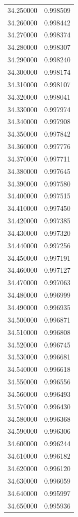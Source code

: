 \begin{tabular}{rr}
34.250000 & 0.998509 \\
34.260000 & 0.998442 \\
34.270000 & 0.998374 \\
34.280000 & 0.998307 \\
34.290000 & 0.998240 \\
34.300000 & 0.998174 \\
34.310000 & 0.998107 \\
34.320000 & 0.998041 \\
34.330000 & 0.997974 \\
34.340000 & 0.997908 \\
34.350000 & 0.997842 \\
34.360000 & 0.997776 \\
34.370000 & 0.997711 \\
34.380000 & 0.997645 \\
34.390000 & 0.997580 \\
34.400000 & 0.997515 \\
34.410000 & 0.997450 \\
34.420000 & 0.997385 \\
34.430000 & 0.997320 \\
34.440000 & 0.997256 \\
34.450000 & 0.997191 \\
34.460000 & 0.997127 \\
34.470000 & 0.997063 \\
34.480000 & 0.996999 \\
34.490000 & 0.996935 \\
34.500000 & 0.996871 \\
34.510000 & 0.996808 \\
34.520000 & 0.996745 \\
34.530000 & 0.996681 \\
34.540000 & 0.996618 \\
34.550000 & 0.996556 \\
34.560000 & 0.996493 \\
34.570000 & 0.996430 \\
34.580000 & 0.996368 \\
34.590000 & 0.996306 \\
34.600000 & 0.996244 \\
34.610000 & 0.996182 \\
34.620000 & 0.996120 \\
34.630000 & 0.996059 \\
34.640000 & 0.995997 \\
34.650000 & 0.995936 \\

\end{tabular}
